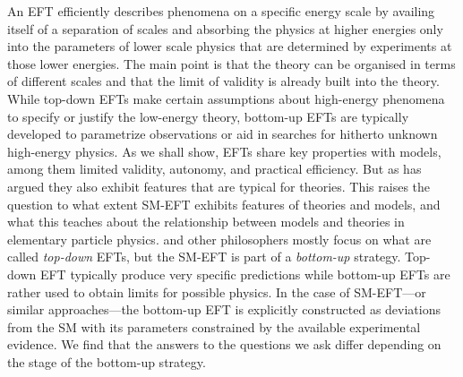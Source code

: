 
An EFT efficiently describes phenomena on a specific energy scale by availing itself of a separation of scales and absorbing the physics at higher energies only into the parameters of lower scale physics that are determined by experiments at those lower energies. 
The main point is that the theory can be organised in terms of different scales and that the limit of validity is already built into the theory. 
While top-down EFTs make certain assumptions about high-energy phenomena to specify or justify the low-energy theory, bottom-up EFTs are typically developed to parametrize observations or aid in searches for hitherto unknown high-energy physics.
As we shall show, EFTs share key properties with models, among them limited validity, autonomy, and practical efficiency. 
But as \citet{hartmann2001} has argued they also exhibit features that are typical for theories. 
This raises the question to what extent SM-EFT exhibits features of theories and models, and what this teaches about the relationship between models and theories in elementary particle physics.
\citet{hartmann2001} and other philosophers mostly focus on what are called \textit{top-down} EFTs, but the SM-EFT is part of a \textit{bottom-up} strategy.
Top-down EFT typically produce very specific predictions while bottom-up EFTs are rather used to obtain limits for possible physics. 
In the case of SM-EFT---or similar approaches---the bottom-up EFT is explicitly constructed as deviations from the SM with its parameters constrained by the available experimental evidence. 
We find that the answers to the questions we ask differ depending on the stage of the bottom-up strategy.



